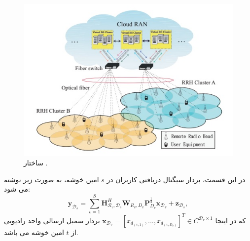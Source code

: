  \begin{figure}[H]
  \centering
    \includegraphics[scale=1]{mimoCRAN}
  \caption{ساختار  \cite{EEcluster}.}
  \label{fig:mimoC-RAN}
\end{figure}
در این قسمت، بردار سیگنال دریافتی کاربران در $s$ امین خوشه، به صورت زیر نوشته می شود:
\begin{equation} \label{sg}
\boldsymbol{y}_{\mathcal{D}_s} = \sum_{v=1}^S \boldsymbol{H}^H_{\mathcal{R}_v,\mathcal{D}_s}\boldsymbol{W}_{R_v, {D}_v}\boldsymbol{P}_{{D}_v}^\frac{1}{2}\boldsymbol{x}_{\mathcal{D}_v}+ \boldsymbol{z}_{\mathcal{D}_s},
\end{equation}
که در اینجا 
$\boldsymbol{x}_{ \mathcal{D}_v} = [x_{ d_{(v,1)}},..., x_{ d_{(v,D_v)}}]^T \in C^{ \mathcal{D}_v \times 1} $ 
بردار سمبل ارسالی واحد رادیویی از $t$ امین خوشه می باشد.

